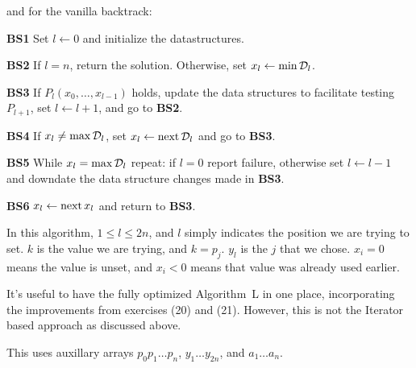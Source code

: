 \noindent and for the vanilla backtrack:

\vskip 0.1in
\item{\bf BS1} Set $l \leftarrow 0$ and initialize the 
 datastructures.
\item{\bf BS2} If $l = n$, return the solution.  Otherwise, set 
 $x_l \leftarrow {\min}\,{\cal D}_l$.
\item{\bf BS3} If $P_l\left(x_0, \ldots, x_{l-1}\right)$ holds, update the 
 data structures to facilitate testing $P_{l+1}$, set $l \leftarrow l + 1$, and 
  go to {\bf BS2}.
\item{\bf BS4} If $x_l \neq {\rm max}\,{\cal D}_l$, set 
  $x_l \leftarrow {\rm next}\,{\cal D}_l$ and go to {\bf BS3}.
\item{\bf BS5} While $x_l = {\rm max}\,{\cal D}_l$ repeat: if $l = 0$ 
 report failure, otherwise set $l \leftarrow l - 1$ and downdate the data 
 structure changes made in {\bf BS3}.
\item{\bf BS6} $x_l \leftarrow {\rm next}\,x_l$ and return to 
 {\bf BS3}.
 \vskip 0.1in


\noindent In this algorithm, $1 \le l \le 2n$, and $l$ simply indicates the 
position we are trying to set.  $k$ is the value we are trying, and $k = p_j$.
$y_l$ is the $j$ that we chose.  $x_i = 0$ means the value is unset, and 
$x_i < 0$ means that value was already used earlier. 


\noindent It's useful to have the fully optimized Algorithm~L in one place, 
incorporating the improvements from exercises (20) and (21).   However, this
is not the Iterator based approach as discussed above.

\noindent This uses auxillary arrays $p_0 p_1 \ldots p_n$, $y_1 \ldots y_{2n}$, 
and $a_1 \ldots a_n$.

